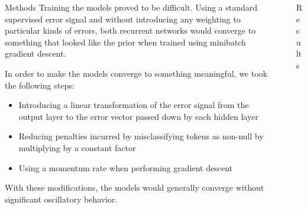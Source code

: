 \documentclass[final]{beamer}
\newlength{\sepwid}
\newlength{\onecolwid}
\newlength{\twocolwid}
\begin{document}
\begin{frame}[t]
\begin{columns}[t]
\begin{column}{\twocolwid}
\begin{column}{\twocolwid}
\begin{block}{Methods}
Training the models proved to be difficult. Using a standard supervised error signal and without introducing any weighting to particular kinds of errors, both recurrent networks would converge to something that looked like the prior when trained using minibatch gradient descent.

In order to make the models converge to something meaningful, we took the following steps:
\begin{itemize}
\item Introducing a linear transformation of the error signal from the output layer to the error vector passed down by each hidden layer
\item Reducing penalties incurred by misclassifying tokens as non-null by multiplying by a constant factor
\item Using a momentum rate when performing gradient descent
\end{itemize}
With these modifications, the models would generally converge without significant oscillatory behavior.
\end{block}



\end{column} %

\end{column} %

\begin{column}{\sepwid}\end{column} %

\begin{column}{\onecolwid} %


\begin{block}{Results}


\end{block}
\end{column}
\end{columns}
\end{frame}
\end{document}
